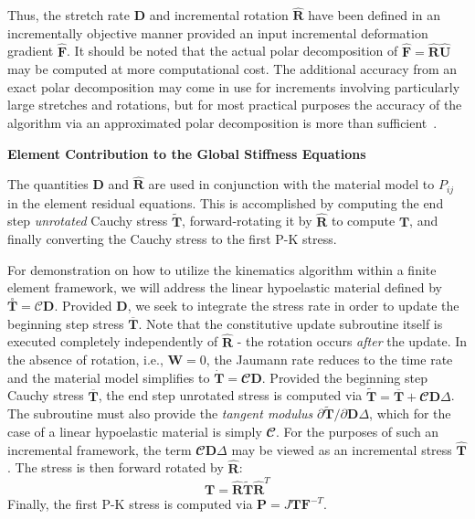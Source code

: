 Thus, the stretch rate $\bm{D}$ and incremental rotation $\hat{\bm{R}}$ have been defined in an incrementally objective manner provided an input incremental deformation gradient $\hat{\bm{F}}$.  It should be noted that the actual polar decomposition of $\hat{\bm{F}} = \hat{\bm{R}}\hat{\bm{U}}$ may be computed at more computational cost. The additional accuracy from an exact polar decomposition may come in use for increments involving particularly large stretches and rotations, but for most practical purposes the accuracy of the algorithm via an approximated polar decomposition is more than sufficient~\cite{rashid_1993}.

\textbf{Element Contribution to the Global Stiffness Equations}

The quantities $\bm{D}$ and $\hat{\bm{R}}$ are used in conjunction with the material model to $P_{ij}$ in the element residual equations. This is accomplished by computing the end step \textit{unrotated} Cauchy stress $\tilde{\bm{T}}$, forward-rotating it by $\hat{\bm{R}}$ to compute $\bm{T}$, and finally converting the Cauchy stress to the first P-K stress.

For demonstration on how to utilize the kinematics algorithm within a finite element framework, we will address the linear hypoelastic material defined by $\overset{\circ}{\bm{T}} = \bm{\mathcal{C}}\bm{D}$. Provided $\bm{D}$, we seek to integrate the stress rate in order to update the beginning step stress $\overline{\bm{T}}$. Note that the constitutive update subroutine itself is executed completely independently of $\hat{\bm{R}}$ - the rotation occurs \textit{after} the update. In the absence of rotation, i.e., $\bm{W} = 0$, the Jaumann rate reduces to the time rate and the material model simplifies to $\dot{\bm{T}} = \mathbfcal{C}\bm{D}$. Provided the beginning step Cauchy stress $\overline{\bm{T}}$, the end step unrotated stress is computed via $\tilde{\bm{T}} = \overline{\bm{T}} + \mathbfcal{C}\bm{D}\Delta$. The subroutine must also provide the \textit{tangent modulus} $\partial\tilde{\bm{T}}/\partial{\bm{D}\Delta}$, which for the case of a linear hypoelastic material is simply $\mathbfcal{C}$. For the purposes of such an incremental framework, the term $\mathbfcal{C}\bm{D}\Delta$ may be viewed as an incremental stress $\hat{\bm{T}}$. The stress is then forward rotated by $\hat{\bm{R}}$:
\begin{equation}
\bm{T} = \hat{\bm{R}}\tilde{\bm{T}}\hat{\bm{R}}^T
\end{equation}
Finally, the first P-K stress is computed via $\bm{P} = J\bm{T}\bm{F}^{-T}$.


